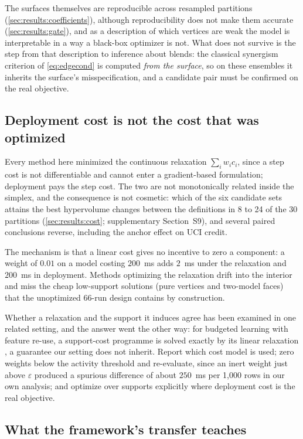 The surfaces themselves are reproducible across resampled partitions (\cref{sec:results:coefficients}), although
reproducibility does not make them accurate (\cref{sec:results:gate}), and as a description of which vertices are weak
the model is interpretable in a way a black-box optimizer is not. What does not survive is the step from that
description to inference about blends: the classical synergism criterion of \cref{eq:edgecond} is computed
\emph{from the surface}, so on these ensembles it inherits the surface's misspecification, and a candidate pair must
be confirmed on the real objective.

\subsection{Deployment cost is not the cost that was optimized}
\label{sec:disc:cost}

Every method here minimized the continuous relaxation $\sum_i w_i c_i$, since a step cost is not differentiable and
cannot enter a gradient-based formulation; deployment pays the step cost. The two are not monotonically related inside
the simplex, and the consequence is not cosmetic: which of the six candidate sets attains the best hypervolume changes
between the definitions in 8 to 24 of the 30 partitions (\cref{sec:results:cost}; supplementary Section~S9), and
several paired conclusions reverse, including the anchor effect on UCI credit.

The mechanism is that a linear cost gives no incentive to zero a component: a weight of $0.01$ on a model costing
$200$~ms adds $2$~ms under the relaxation and $200$~ms in deployment. Methods optimizing the relaxation drift into the
interior and miss the cheap low-support solutions (pure vertices and two-model faces) that the unoptimized
66-run design contains by construction.

Whether a relaxation and the support it induces agree has been examined in one related setting, and the answer went
the other way: for budgeted learning with feature re-use, a support-cost programme is solved exactly by its linear
relaxation \citep{nan2016pruning}, a guarantee our setting does not inherit. Report which cost model is used; zero
weights below the activity threshold and re-evaluate, since an inert weight just above $\varepsilon$ produced a
spurious difference of about $250$~ms per 1{,}000 rows in our own analysis; and optimize over supports explicitly
where deployment cost is the
real objective.

\subsection{What the framework's transfer teaches}
\label{sec:disc:transfer}

